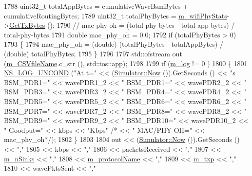 \begin{DoxyCode}
1788   uint32\_t totalAppBytes = cumulativeWaveBsmBytes + cumulativeRoutingBytes;
1789   uint32\_t totalPhyBytes = \hyperlink{classVanetRoutingExperiment_a6b7260aa3838c95f5a839d0cea09393f}{m\_wifiPhyStats}->\hyperlink{classWifiPhyStats_ab5878680763677fc1f1697d013010e52}{GetTxBytes} ();
1790   \textcolor{comment}{// mac-phy-oh = (total-phy-bytes - total-app-bytes) / total-phy-bytes}
1791   \textcolor{keywordtype}{double} mac\_phy\_oh = 0.0;
1792   \textcolor{keywordflow}{if} (totalPhyBytes > 0)
1793     \{
1794       mac\_phy\_oh = (double) (totalPhyBytes - totalAppBytes) / (double) totalPhyBytes;
1795     \}
1796 
1797   std::ofstream out (\hyperlink{classVanetRoutingExperiment_a0fab315c81d7da9e59216c3790f55da4}{m\_CSVfileName}.c\_str (), std::ios::app);
1798 
1799   \textcolor{keywordflow}{if} (\hyperlink{classVanetRoutingExperiment_a00992fb96b315d44825876814cb37af8}{m\_log} != 0 )
1800     \{
1801       \hyperlink{log-macros-disabled_8h_a0b36e5e182b37194f85ef1c5e979fb2e}{NS\_LOG\_UNCOND} (\textcolor{stringliteral}{"At t="} << (\hyperlink{group__simulator_gac3635e2e87f7ce316c89290ee1b01d0d}{Simulator::Now} ()).GetSeconds () << \textcolor{stringliteral}{"s
       BSM\_PDR1="} << wavePDR1\_2 << \textcolor{stringliteral}{" BSM\_PDR1="} << wavePDR2\_2 << \textcolor{stringliteral}{" BSM\_PDR3="} << wavePDR3\_2 << \textcolor{stringliteral}{" BSM\_PDR4="} << wavePDR4\_2 
      << \textcolor{stringliteral}{" BSM\_PDR5="} << wavePDR5\_2 << \textcolor{stringliteral}{" BSM\_PDR6="} << wavePDR6\_2 << \textcolor{stringliteral}{" BSM\_PDR7="} << wavePDR7\_2 << \textcolor{stringliteral}{" BSM\_PDR8="} << 
      wavePDR8\_2 << \textcolor{stringliteral}{" BSM\_PDR9="} << wavePDR9\_2 << \textcolor{stringliteral}{" BSM\_PDR10="} << wavePDR10\_2 << \textcolor{stringliteral}{" Goodput="} << kbps << \textcolor{stringliteral}{"Kbps"} \textcolor{comment}{/*
      << " MAC/PHY-OH=" << mac\_phy\_oh*/});
1802     \}
1803 
1804   out << (\hyperlink{group__simulator_gac3635e2e87f7ce316c89290ee1b01d0d}{Simulator::Now} ()).GetSeconds () << \textcolor{stringliteral}{","}
1805       << kbps << \textcolor{stringliteral}{","}
1806       << packetsReceived << \textcolor{stringliteral}{","}
1807       << \hyperlink{classVanetRoutingExperiment_ab17a92877232a685d02e7980368e6ba5}{m\_nSinks} << \textcolor{stringliteral}{","}
1808       << \hyperlink{classVanetRoutingExperiment_a59e637db2de3f919b261e4b733285f44}{m\_protocolName} << \textcolor{stringliteral}{","}
1809       << \hyperlink{classVanetRoutingExperiment_a8acdb7cf31487aa0d721263fde2a7f3e}{m\_txp} << \textcolor{stringliteral}{","}
1810       << wavePktsSent << \textcolor{stringliteral}{","}

\end{DoxyCode}
